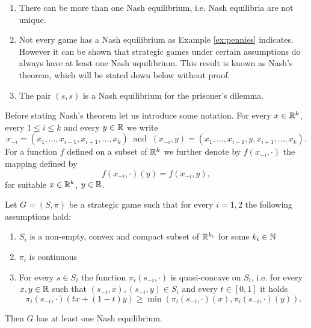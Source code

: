 \begin{remark}
    \begin{enumerate}
        \item There can be more than one Nash equilibrium, i.e. Nash equilibria are not unique.
        \item Not every game has a Nash equilibrium as Example \ref{ex:pennies} indicates. However it can be shown that strategic games under certain 
            assumptions do always have at least one Nash uquilibrium. This result is known as Nash's theorem, which will be stated down below without
            proof.
        \item The pair $(s, s)$ is a Nash equilibrium for the prisoner's dilemma. 
    \end{enumerate}
\end{remark}

Before stating Nash's theorem let us introduce some notation. For every $x\in\mathbb{R}^{k}$, every $1\leq i\leq k$ and every $y\in\mathbb{R}$ we write
\begin{equation*}
    x_{-i} = (x_{1}, \ldots, x_{i - 1}, x_{i + 1}, \ldots, x_{k}) ~\text{ and }~ (x_{-i}, y) = (x_{1}, \ldots, x_{i - 1}, y, x_{i + 1}, \ldots, x_{k}).
\end{equation*}
For a function $f$ defined on a subset of $\mathbb{R}^{k}$ we further denote by $f(x_{-i}, \cdot)$ the mapping defined by
\begin{equation*}
    f(x_{-i}, \cdot)(y) = f(x_{-i}, y),
\end{equation*}
for suitable $x\in\mathbb{R}^{k}$, $y\in\mathbb{R}$.

\begin{theorem}
    Let $G = (S, \pi)$ be a strategic game such that for every $i = 1, 2$ the following assumptions hold:
    \begin{enumerate}
        \item $S_{i}$ is a non-empty, convex and compact subset of $\mathbb{R}^{k_{i}}$ for some $k_{i}\in\mathbb{N}$
        \item $\pi_{i}$ is continuous
        \item For every $s\in S_{i}$ the function $\pi_{i}(s_{-i}, \cdot)$ is quasi-concave on $S_{i}$, i.e. for every $x, y \in\mathbb{R}$ such that
            $(s_{-i}, x), (s_{-i}, y)\in S_{i}$ and every $t\in[0, 1]$ it holds 
            \begin{equation*}
                \pi_{i}(s_{-i}, \cdot)(tx + (1 - t)y)\geq\min(\pi_{i}(s_{-i}, \cdot)(x), \pi_{i}(s_{-i}, \cdot)(y)).
            \end{equation*}
    \end{enumerate}
    Then $G$ has at least one Nash equilibrium.
\end{theorem}

